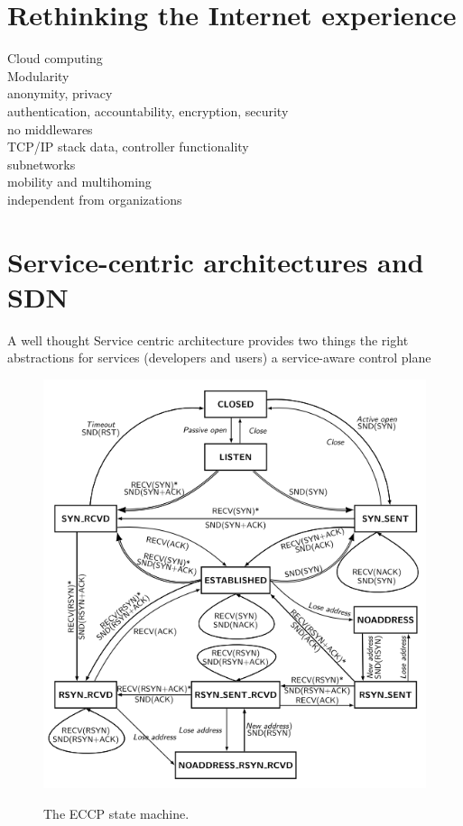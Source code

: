 \documentclass[12pt,a4paper,oneside]{article}
\begin{document}
\section{Rethinking the Internet experience}
Cloud computing
\\Modularity
\\anonymity, privacy
\\authentication, accountability, encryption, security
\\no middlewares
\\TCP/IP stack data, controller functionality
\\subnetworks
\\mobility and multihoming
\\independent from organizations

\newpage
\section{Service-centric architectures and SDN}
A well thought Service centric architecture provides two things
the right abstractions for services (developers and users)
a service-aware control plane

\begin{figure}
\centering
{}
\includegraphics[scale=0.6]{figures/ECCP_sm}
\label{fig:EECP_sm}
\caption[The ECCP state machine]{The ECCP \cite{Arye2012} state machine.}
\end{figure}
\end{document}
